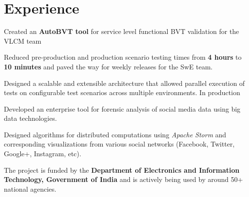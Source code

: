 \documentclass[]{deedy-resume-openfont}
\begin{document}
%
%

%
%

\begin{minipage}[t]{0.66\textwidth} 


\section{Experience}
\vspace{\topsep} %
\begin{tightemize}
\item Created an \textbf{AutoBVT tool} for service level functional BVT validation for the VLCM team
\item Reduced pre-production and production scenario testing times from \textbf{4 hours} to \textbf{10 minutes} and paved the way for weekly releases for the SwE team.
\item
Designed a scalable and extensible architecture that allowed parallel execution of tests on configurable test scenarios across multiple environments. In production
\end{tightemize}
\sectionsep

\begin{tightemize}
\item Developed an enterprise tool for forensic analysis of social media data using big data technologies. 
\item Designed algorithms for distributed computations using \textit{Apache Storm} and corresponding visualizations from various social networks (Facebook, Twitter, Google+, Instagram, etc). 
\item The project is funded by the \textbf{Department of Electronics and Information Technology, Government of India} and is actively being used by around 50+ national agencies.
\end{tightemize}


\end{minipage}
\end{document}
